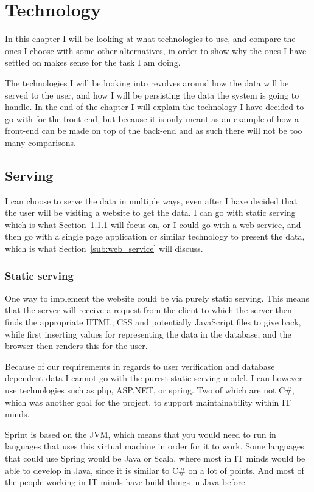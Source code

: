 \chapter{Technology}
\label{chap:Technology}
In this chapter I will be looking at what technologies to use, and compare the
ones I choose with some other alternatives, in order to show why the ones I have
settled on makes sense for the task I am doing. 

The technologies I will be looking into revolves around how the data will be
served to the user, and how I will be persisting the data the system is going to
handle. In the end of the chapter I will explain the technology I have decided
to go with for the front-end, but because it is only meant as an example of how a
front-end can be made on top of the back-end and as such there will not be too
many comparisons.

\section{Serving}
\label{sec:Serving}
I can choose to serve the data in multiple ways, even after I have decided that
the user will be visiting a website to get the data. I can go with static
serving which is what Section~\ref{sub:Static_serving} will focus on, or I
could go with a web service, and then go with a single page application or
similar technology to present the data, which is what
Section~\ref{sub:web_service} will discuss. 

\subsection{Static serving}
\label{sub:Static_serving}

One way to implement the website could be via purely static serving. This means
that the server will receive a request from the client to which the server then
finds the appropriate HTML, CSS and potentially JavaScript files to give back,
while first inserting values for representing the data in the database, and the
browser then renders this for the user. 

Because of our requirements in regards to user verification and database
dependent data I cannot go with the purest static serving model. I can however
use technologies such as php, ASP.NET, or spring. Two of which are not C\#,
which was another goal for the project, to support maintainability within IT
minds. 

Sprint is based on the JVM\cite{spring-framework}, which means that you would need to run in languages that uses this virtual machine in order for it to work. Some languages that could use Spring would be Java or Scala, where most in IT minds would be able to develop in Java, since it is similar to C\# on a lot of points. And most of the people working in IT minds have build things in Java before.

